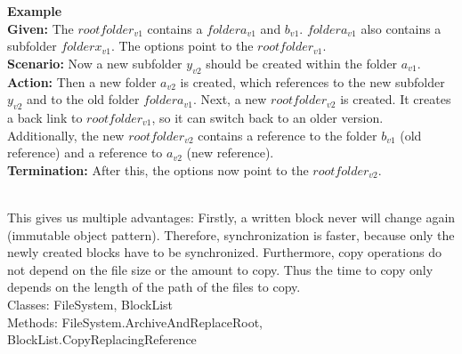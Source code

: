 \documentclass[JCDReport.tex]{subfiles}
\begin{document}
\parbox{\textwidth}{
\textbf{Example}\\
\textbf{Given:} The $root folder_{v1}$ contains a $folder a_{v1}$ and $b_{v1}$. $folder a_{v1}$ also contains a subfolder $folder x_{v1}$. The options point to the $root folder_{v1}$.\\
\textbf{Scenario:} Now a new subfolder $y_{v2}$ should be created within the folder $a_{v1}$.\\
\textbf{Action:} Then a new folder $a_{v2}$ is created, which references to the new subfolder $y_{v2}$ and to the old folder $folder a_{v1}$. Next, a new $root folder_{v2}$ is created. It creates a back link to $root folder_{v1}$, so it can switch back to an older version. Additionally, the new $root folder_{v2}$ contains a reference to the folder $b_{v1}$ (old reference) and a reference to $a_{v2}$ (new reference).\\
\textbf{Termination:} After this, the options now point to the $root folder_{v2}$.\\
\\
}

This gives us multiple advantages: Firstly, a written block never will change again (immutable object pattern). Therefore, synchronization is faster, because only the newly created blocks have to be synchronized. Furthermore, copy operations do not depend on the file size or the amount to copy. Thus the time to copy only depends on the length of the path of the files to copy.\\
Classes: FileSystem, BlockList\\
Methods: FileSystem.ArchiveAndReplaceRoot, BlockList.CopyReplacingReference
\end{document}
